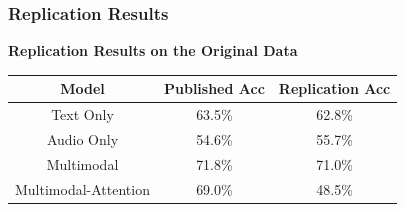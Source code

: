 \documentclass{beamer}
\begin{document}
\begin{frame}
\frametitle{Replication Results}

  
  
 \textbf{Replication Results on the Original Data}      

            \begin{center}
                \begin{tabular}{||c c c||} 
                 \hline
                 Model & Published Acc  & Replication Acc\\ [0.2ex] 
                 \hline\hline
                 Text Only & 63.5\% & 62.8\%\\ 
                 \hline
                 Audio Only & 54.6\%  &   55.7\%\\
                 \hline
                 Multimodal & 71.8\% & 71.0\%\\
                 \hline
                 Multimodal-Attention & 69.0\%  & 48.5\%\\
                 \hline
                \end{tabular}
            \end{center}
   

\end{frame}
\end{document}
